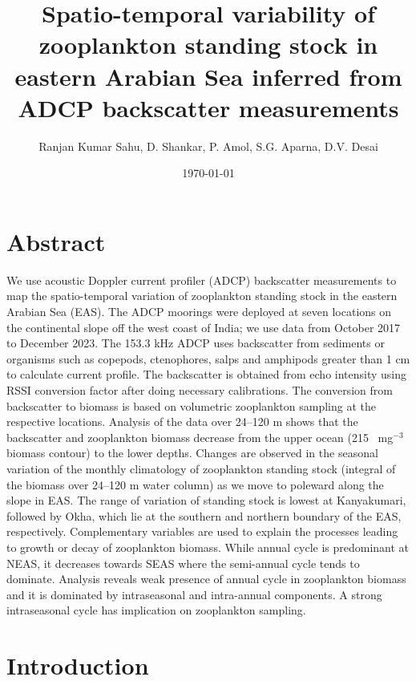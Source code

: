 \documentclass{article}
\title{Spatio-temporal variability of zooplankton standing stock in eastern Arabian Sea inferred from ADCP backscatter measurements }}
\author{Ranjan Kumar Sahu, D. Shankar, P. Amol, S.G. Aparna,  D.V. Desai}
\date{\today}
\begin{document}
	

	\maketitle
	\linenumbers
	\section*{Abstract}
	
We use acoustic Doppler current profiler (ADCP) backscatter measurements to map
the spatio-temporal variation of zooplankton standing stock in the eastern Arabian Sea (EAS). The ADCP moorings were deployed at seven locations on the continental slope off the west coast of India; we use data from October 2017 to December 2023. The 153.3 kHz ADCP uses backscatter from sediments or organisms such as copepods, ctenophores, salps and amphipods greater than 1 cm to calculate current profile. The backscatter is obtained from echo intensity using RSSI conversion factor after doing necessary calibrations. The conversion from backscatter to biomass is based on volumetric zooplankton sampling at the respective locations. Analysis of the data over 24--120 m shows that the backscatter and zooplankton biomass decrease from the upper ocean (215 ~mg$^{-3}$ biomass contour) to the lower depths. Changes are observed in the seasonal variation of the monthly climatology of zooplankton standing stock (integral of the biomass over 24--120 m water
column) as we move to poleward along the slope in EAS. The range of variation of standing stock is lowest at Kanyakumari, followed by Okha, which lie at the southern and northern boundary of the EAS, respectively. Complementary variables are used to explain the processes leading to growth or decay of zooplankton biomass.  While annual cycle is predominant at NEAS, it decreases towards SEAS where the semi-annual cycle tends to dominate. Analysis reveals weak presence of annual cycle in zooplankton biomass and it is dominated by intraseasonal and intra-annual components. A strong intraseasonal cycle has implication on zooplankton sampling. 


	\newpage
	\section{Introduction}
\end{document}

